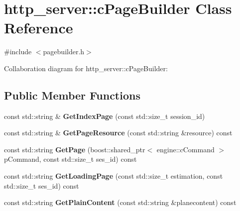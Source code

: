 \hypertarget{classhttp__server_1_1cPageBuilder}{\section{http\-\_\-server\-:\-:c\-Page\-Builder Class Reference}
\label{classhttp__server_1_1cPageBuilder}
}


{\ttfamily \#include $<$pagebuilder.\-h$>$}



Collaboration diagram for http\-\_\-server\-:\-:c\-Page\-Builder\-:
\subsection*{Public Member Functions}
\begin{DoxyCompactItemize}
\item 
\hypertarget{classhttp__server_1_1cPageBuilder_a045ba157650645c9b2790389618f98d3}{const std\-::string \& {\bfseries Get\-Index\-Page} (const std\-::size\-\_\-t session\-\_\-id)}\label{classhttp__server_1_1cPageBuilder_a045ba157650645c9b2790389618f98d3}

\item 
\hypertarget{classhttp__server_1_1cPageBuilder_ac7a52ef639767e3f9297376cced2a8ab}{const std\-::string \& {\bfseries Get\-Page\-Resource} (const std\-::string \&resource) const }\label{classhttp__server_1_1cPageBuilder_ac7a52ef639767e3f9297376cced2a8ab}

\item 
\hypertarget{classhttp__server_1_1cPageBuilder_aeeceb8e7eaee48e942220bfb94b4644b}{const std\-::string {\bfseries Get\-Page} (boost\-::shared\-\_\-ptr$<$ engine\-::c\-Command $>$ p\-Command, const std\-::size\-\_\-t ses\-\_\-id) const }\label{classhttp__server_1_1cPageBuilder_aeeceb8e7eaee48e942220bfb94b4644b}

\item 
\hypertarget{classhttp__server_1_1cPageBuilder_a510f14c10b161fa8b38d5ec52c7340e4}{const std\-::string {\bfseries Get\-Loading\-Page} (const std\-::size\-\_\-t estimation, const std\-::size\-\_\-t ses\-\_\-id) const }\label{classhttp__server_1_1cPageBuilder_a510f14c10b161fa8b38d5ec52c7340e4}

\item 
\hypertarget{classhttp__server_1_1cPageBuilder_a1d94480e16491f15aa3ed974dfb181e1}{const std\-::string {\bfseries Get\-Plain\-Content} (const std\-::string \&planecontent) const }\label{classhttp__server_1_1cPageBuilder_a1d94480e16491f15aa3ed974dfb181e1}

\end{DoxyCompactItemize}
